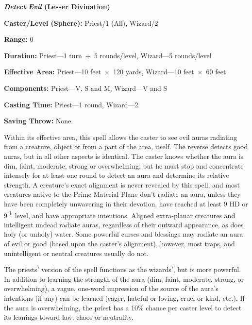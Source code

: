 \begin{multicols}{2}
\vspace{1em}

\noindent
\begin{minipage}{\columnwidth}

\noindent \textbf{\textit{Detect Evil} (Lesser Divination)}

\noindent \textbf{Caster/Level (Sphere):} Priest/1 (All), Wizard/2

\noindent \textbf{Range:} 0

\noindent \textbf{Duration:} Priest---1 turn~+~5 rounds/level, Wizard---5 rounds/level

\noindent \textbf{Effective Area:} Priest---10 feet~$\times$~120 yards, Wizard---10 feet~$\times$~60 feet

\noindent \textbf{Components:} Priest---V, S and M, Wizard---V and S

\noindent \textbf{Casting Time:} Priest---1 round, Wizard---2

\noindent \textbf{Saving Throw:} None

\end{minipage}

Within its effective area, this spell allows the caster to see evil auras radiating from a creature, object or from a part of the area, itself.  The reverse detects good auras, but in all other aspects is identical.  The caster knows whether the aura is dim, faint, moderate, strong or overwhelming, but he must stop and concentrate intensely for at least one round to detect an aura and determine its relative strength.  A creature's exact alignment is never revealed by this spell, and most creatures native to the Prime Material Plane don't radiate an aura, unless they have been completely unwavering in their devotion, have reached at least 9 HD or 9\textsuperscript{th} level, and have appropriate intentions.  Aligned extra-planar creatures and intelligent undead radiate auras, regardless of their outward appearance, as does holy (or unholy) water.  Some powerful curses and blessings may radiate an aura of evil or good (based upon the caster's alignment), however, most traps, and unintelligent or neutral creatures usually do not.

The priests' version of the spell functions as the wizards', but is more powerful.  In addition to learning the strength of the aura (dim, faint, moderate, strong, or overwhelming), a vague, one-word impression of the source of the aura's intentions (if any) can be learned (eager, hateful or loving, cruel or kind, etc.).  If the aura is overwhelming, the priest has a 10\% chance per caster level to detect its leanings toward law, chaos or neutrality.


\end{multicols}
